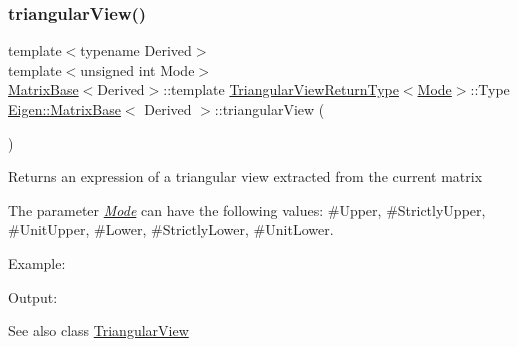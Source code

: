 \subsubsection{\texorpdfstring{triangularView()}{triangularView()}\hspace{0.1cm}{\footnotesize\ttfamily [1/2]}}
{\footnotesize\ttfamily template$<$typename Derived$>$ \\
template$<$unsigned int Mode$>$ \\
\mbox{\hyperlink{class_eigen_1_1_matrix_base}{Matrix\+Base}}$<$Derived$>$\+::template \mbox{\hyperlink{struct_eigen_1_1_matrix_base_1_1_triangular_view_return_type}{Triangular\+View\+Return\+Type}}$<$\mbox{\hyperlink{struct_mode}{Mode}}$>$\+::Type \mbox{\hyperlink{class_eigen_1_1_matrix_base}{Eigen\+::\+Matrix\+Base}}$<$ Derived $>$\+::triangular\+View (\begin{DoxyParamCaption}{ }\end{DoxyParamCaption})}

\begin{DoxyReturn}{Returns}
an expression of a triangular view extracted from the current matrix
\end{DoxyReturn}
The parameter {\itshape \mbox{\hyperlink{struct_mode}{Mode}}} can have the following values\+: {\ttfamily \#\+Upper}, {\ttfamily \#\+Strictly\+Upper}, {\ttfamily \#\+Unit\+Upper}, {\ttfamily \#\+Lower}, {\ttfamily \#\+Strictly\+Lower}, {\ttfamily \#\+Unit\+Lower}.

Example\+: 
\begin{DoxyCodeInclude}{0}
\end{DoxyCodeInclude}
 Output\+: 
\begin{DoxyVerbInclude}
\end{DoxyVerbInclude}


\begin{DoxySeeAlso}{See also}
class \mbox{\hyperlink{class_eigen_1_1_triangular_view}{Triangular\+View}} 
\end{DoxySeeAlso}
\mbox{\label{class_eigen_1_1_matrix_base_aa044521145e74117ad1df42460d7b520}} 
